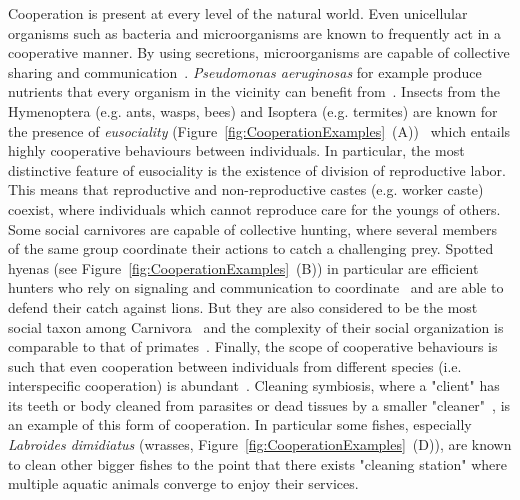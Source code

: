     Cooperation is present at every level of the natural world. Even unicellular organisms such as bacteria and microorganisms are known to frequently act in a cooperative manner. By using secretions, microorganisms are capable of collective sharing and communication~\parencite{Elena2003, Keller2006, West2006}. \emph{Pseudomonas aeruginosas} for example produce nutrients that every organism in the vicinity can benefit from~\parencite{Popat2012, Harrison2013}. Insects from the Hymenoptera (e.g. ants, wasps, bees) and Isoptera (e.g. termites) are known for the presence of \emph{eusociality} (Figure~\ref{fig:CooperationExamples}~(A))~\parencite{Wilson1990} which entails highly cooperative behaviours between individuals. In particular, the most distinctive feature of eusociality is the existence of division of reproductive labor. This means that reproductive and non-reproductive castes (e.g. worker caste) coexist, where individuals which cannot reproduce care for the youngs of others. Some social carnivores are capable of collective hunting, where several members of the same group coordinate their actions to catch a challenging prey. Spotted hyenas (see Figure~\ref{fig:CooperationExamples}~(B)) in particular are efficient hunters who rely on signaling and communication to coordinate~\parencite{Drea2009a, Smith2010, Smith2012a} and are able to defend their catch against lions. But they are also considered to be the most social taxon among Carnivora~\parencite{Mills2003} and the complexity of their social organization is comparable to that of primates~\parencite{Drea2003}. Finally, the scope of cooperative behaviours is such that even cooperation between individuals from different species (i.e. interspecific cooperation) is abundant~\parencite{Bshary2004}. Cleaning symbiosis, where a "client" has its teeth or body cleaned from parasites or dead tissues by a smaller "cleaner"~\parencite{Poulin1996}, is an example of this form of cooperation. In particular some fishes, especially \emph{Labroides dimidiatus} (wrasses, Figure~\ref{fig:CooperationExamples}~(D)), are known to clean other bigger fishes to the point that there exists "cleaning station" where multiple aquatic animals converge to enjoy their services.


